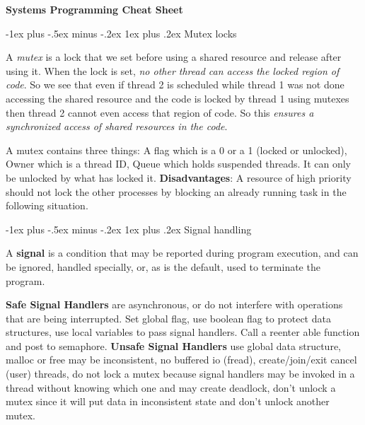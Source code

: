 \documentclass[10pt,landscape, a4paper]{article}
\makeatletter
\renewcommand{\subsection}{\@startsection{section}{1}{0mm}%
                                {-1ex plus -.5ex minus -.2ex}%
                                {0.5ex plus .2ex}%
                                {\normalfont\large\bfseries}}
\renewcommand{\subsection}{\@startsection{subsection}{2}{0mm}%
                                {-1explus -.5ex minus -.2ex}%
                                {0.5ex plus .2ex}%
                                {\normalfont\normalsize\bfseries}}
\renewcommand{\subsection}{\@startsection{subsubsection}{3}{0mm}%
                                {-1ex plus -.5ex minus -.2ex}%
                                {1ex plus .2ex}%
                                {\normalfont\small\bfseries}}
\makeatother
\begin{document}
\renewcommand{\ttdefault}{cmtt}

\raggedright
\footnotesize
\begin{multicols}{3}

\setlength{\premulticols}{1pt}
\setlength{\postmulticols}{1pt}
\setlength{\multicolsep}{1pt}
\setlength{\columnsep}{2pt}

\begin{center}
     \Large{\textbf{Systems Programming Cheat Sheet}} \\
\end{center}

\subsection{Mutex locks}

A \emph{mutex} is a lock that we set before using a shared resource and release after using it. 
When the lock is set, \emph{no other thread can access the locked region of code}. 
So we see that even if thread 2 is scheduled while thread 1 was not done accessing 
the shared resource and the code is locked by thread 1 using mutexes then thread 2 
cannot even access that region of code. So this \emph{ensures a synchronized access of shared resources in the code}.



A mutex contains three things: A flag which is a 0 or a 1 (locked or unlocked), 
Owner which is a thread ID, Queue which holds suspended threads. 
It can only be unlocked by what has locked it.
\textbf{Disadvantages}: A resource of high priority should not lock the other 
processes by blocking an already running task in the following situation.

\subsection{Signal handling}

A {\bf signal} is a condition that may be reported during program execution, 
and can be ignored, handled specially, or, as is the default, 
used to terminate the program.



\textbf{Safe Signal Handlers} are asynchronous, or do not interfere with operations 
that are being interrupted.
Set global flag, use boolean 
flag to protect data structures, use local variables to 
pass signal handlers.
Call a reenter able function and post to semaphore.
\textbf{Unsafe Signal Handlers} use global data structure, 
malloc or free may be inconsistent, no buffered io (fread), 
create/join/exit cancel (user) threads, do not lock a mutex 
because signal handlers may be invoked in a thread without 
knowing which one and may create deadlock, don't unlock a mutex 
since it will put data in inconsistent state and don't unlock another mutex.


\end{multicols}
\end{document}
